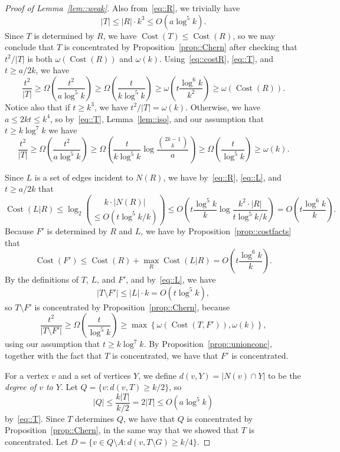\documentclass[12pt]{article}
\DeclareMathOperator{\cost}{Cost}
\begin{document}
\begin{proof}[Proof of Lemma~\ref{lem::weak}]
Also from~\eqref{eq::R}, we trivially have
\begin{equation}\label{eq::T}
|T| \leq |R| \cdot k^3 \leq O(a \log^5 k) .
\end{equation}
Since $T$ is determined by $R$, we have $\cost(T) \leq \cost(R)$, so we may conclude that $T$ is concentrated by Proposition~\ref{prop::Chern} after checking that $t^2/|T|$ is both $\omega(\cost(R))$ and $\omega(k)$. Using~\eqref{eq::costR}, \eqref{eq::T}, and $t \geq a/2k$, we have
\[ \frac{t^2}{|T|} \geq \Omega\left( \frac{t^2}{a \log^5 k} \right) \geq \Omega\left( \frac{t}{k \log^5 k} \right) \geq \omega\left( t \frac{\log^6 k}{k^2} \right) \geq \omega(\cost(R)) .\]
Notice also that if $t \geq k^3$, we have $t^2/|T| = \omega(k)$. Otherwise, we have $a \leq 2kt \leq k^4$, so by~\eqref{eq::T}, Lemma~\ref{lem::iso}, and our assumption that $t \geq k\log^7 k$ we have
\[ \frac{t^2}{|T|} \geq \Omega\left( \frac{t^2}{a \log^5 k} \right) \geq \Omega\left( \frac{t}{k \log^5 k} \log\frac{\binom{2k-1}{k}}{a} \right) \geq \Omega\left( \frac{t}{\log^5 k} \right) \geq \omega(k) .\]

Since $L$ is a set of edges incident to $N(R)$, we have by~\eqref{eq::R}, \eqref{eq::L}, and $t \geq a/2k$ that
\[ \cost(L|R) \leq \log_2 \binom{k\cdot |N(R)|}{\leq O\left(t\log^5k/k\right)} \leq O\left( t \frac{\log^5 k}{k} \log\frac{k^2 \cdot |R|}{t \log^5 k / k} \right) = O\left( t \frac{\log^6 k}{k} \right) .\]
Because $F'$ is determined by $R$ and $L$, we have by Proposition~\ref{prop::costfacts} that
\begin{equation}\label{eq::costF'}
\cost(F') \leq \cost(R) + \max_R \cost(L|R) = O\left( t \frac{\log^6 k}{k} \right) .
\end{equation}
By the definitions of $T$, $L$, and $F'$, and by~\eqref{eq::L}, we have
\begin{equation}\label{eq::T-F'}
|T \setminus F'| \leq |L| \cdot k = O(t\log^5 k) ,
\end{equation}
so $T \setminus F'$ is concentrated by Proposition~\ref{prop::Chern}, because
\[ \frac{t^2}{|T \setminus F'|} \geq \Omega\left( \frac{t}{\log^5 k} \right) \geq \max\left\{\omega\left( \cost(T,F') \right), \omega(k)\right\} ,\]
using our assumption that $t \geq k \log^7 k$.
By Proposition~\ref{prop::unionconc}, together with the fact that $T$ is concentrated, we have that $F'$ is concentrated.

For a vertex $v$ and a set of vertices $Y$, we define $d(v,Y) = |N(v) \cap Y|$ to be the \emph{degree of $v$ to $Y$}.
Let $Q = \{v : d(v,T) \geq k/2\}$, so
\begin{equation}\label{eq::Q}
|Q| \leq \frac{k|T|}{k/2} = 2|T| \leq O(a \log^5 k) 
\end{equation}
by~\eqref{eq::T}. Since $T$ determines $Q$, we have that $Q$ is concentrated by Proposition~\ref{prop::Chern}, in the same way that we showed that $T$ is concentrated. Let $D = \{v \in Q \setminus A : d(v,T\setminus G) \geq k/4\}$.


\end{proof}
\end{document}
